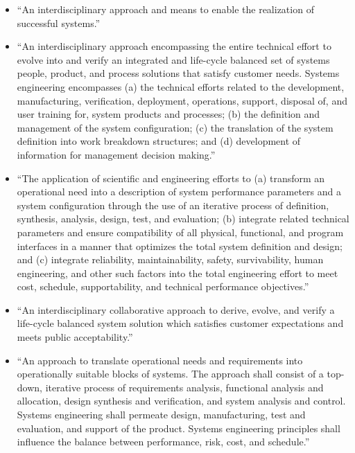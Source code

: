 \begin{itemize}
	\item “An interdisciplinary approach and means to enable the realization of successful systems.”
	\item “An interdisciplinary approach encompassing the entire technical effort to evolve into and verify an integrated and life-cycle balanced set of systems people, product, and process solutions that satisfy customer needs. Systems engineering encompasses (a) the technical efforts related to the development, manufacturing, verification, deployment, operations, support, disposal of, and user training for, system products and processes; (b) the definition and management of the system configuration; (c) the translation of the system definition into work breakdown structures; and (d) development of information for management decision making.”
	\item “The application of scientific and engineering efforts to (a) transform an operational need into a description of system performance parameters and a system configuration through the use of an iterative process of definition, synthesis, analysis, design, test, and evaluation; (b) integrate related technical parameters and ensure compatibility of all physical, functional, and program interfaces in a manner that optimizes the total system definition and design; and (c) integrate reliability, maintainability, safety, survivability, human engineering, and other such factors into the total engineering effort to meet cost, schedule, supportability, and technical performance objectives.”
	\item “An interdisciplinary collaborative approach to derive, evolve, and verify a life-cycle balanced system solution which satisfies customer expectations and meets public acceptability.”
	\item “An approach to translate operational needs and requirements into operationally suitable blocks of systems. The approach shall consist of a top-down, iterative process of requirements analysis, functional analysis and allocation, design synthesis and verification, and system analysis and control. Systems engineering shall permeate design, manufacturing, test and evaluation, and support of the product. Systems engineering principles shall influence the balance between performance, risk, cost, and schedule.”
\end{itemize}

